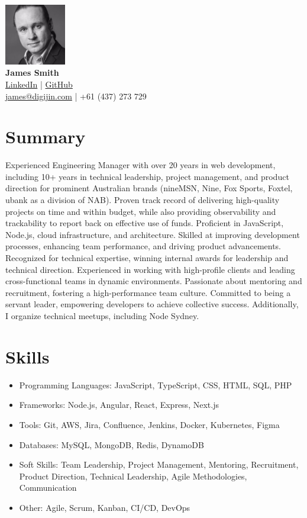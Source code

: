 \documentclass[a4paper,10pt]{article}
\begin{document}
\begin{center}
    \includegraphics[width=0.2\textwidth]{src/profile.jpg} \\ %
    {\Huge \textbf{James Smith}} \\
    \href{https://www.linkedin.com/in/digijin/}{LinkedIn} | \href{https://github.com/digijin}{GitHub} \\
    \href{mailto:james@digijin.com}{james@digijin.com} | +61 (437) 273 729
\end{center}

\section*{Summary}
Experienced Engineering Manager with over 20 years in web development, including 10+ years in technical leadership, project management, and product direction for prominent Australian brands (nineMSN, Nine, Fox Sports, Foxtel, ubank as a division of NAB). Proven track record of delivering high-quality projects on time and within budget, while also providing observability and trackability to report back on effective use of funds. Proficient in JavaScript, Node.js, cloud infrastructure, and architecture. Skilled at improving development processes, enhancing team performance, and driving product advancements. Recognized for technical expertise, winning internal awards for leadership and technical direction. Experienced in working with high-profile clients and leading cross-functional teams in dynamic environments. Passionate about mentoring and recruitment, fostering a high-performance team culture. Committed to being a servant leader, empowering developers to achieve collective success. Additionally, I organize technical meetups, including Node Sydney.

\section*{Skills}
\begin{itemize}
    \item Programming Languages: JavaScript, TypeScript, CSS, HTML, SQL, PHP
    \item Frameworks: Node.js, Angular, React, Express, Next.js
    \item Tools: Git, AWS, Jira, Confluence, Jenkins, Docker, Kubernetes, Figma
    \item Databases: MySQL, MongoDB, Redis, DynamoDB
    \item Soft Skills: Team Leadership, Project Management, Mentoring, Recruitment, Product Direction, Technical Leadership, Agile Methodologies, Communication
    \item Other: Agile, Scrum, Kanban, CI/CD, DevOps
\end{itemize}
\end{document}
